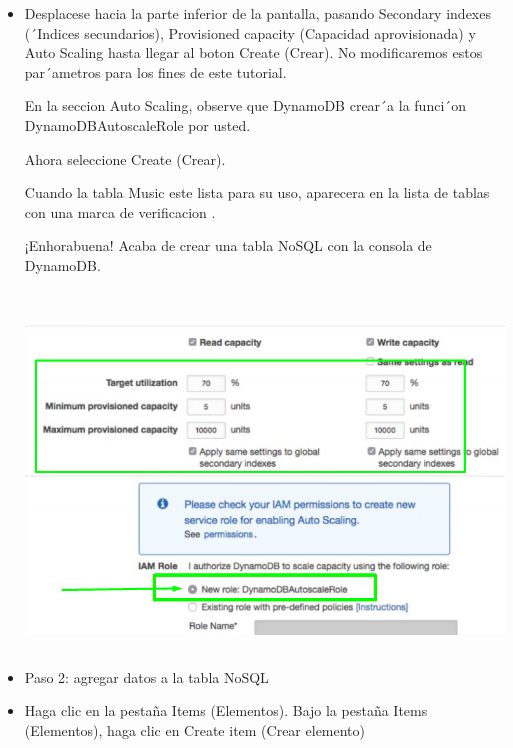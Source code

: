\documentclass[12pt,a4paper,oneside]{book}
\begin{document}
\begin{itemize}
\end{itemize}



	\newpage
\begin{itemize}
	\item {Desplacese hacia la parte inferior de la pantalla, pasando Secondary indexes (´Indices secundarios), Provisioned capacity (Capacidad aprovisionada) y Auto Scaling hasta llegar al boton Create (Crear). No modificaremos estos par´ametros para los fines de este tutorial.
		
		En la seccion Auto Scaling, observe que DynamoDB crear´a la funci´on DynamoDBAutoscaleRole por usted.
		
		Ahora seleccione Create (Crear).
		
		Cuando la tabla Music este lista para su uso, aparecera en la lista de tablas con una marca de verificacion .
		
		¡Enhorabuena! Acaba de crear una tabla NoSQL con la consola de DynamoDB.}\\
	
	\includegraphics[width=16cm, height=9cm]{img/8.png}\\
	
	
	
	\item {Paso 2: agregar datos a la tabla NoSQL}\\
	
	\item {Haga clic en la pestaña Items (Elementos). Bajo la pestaña Items (Elementos), haga clic en Create item (Crear elemento)}\\
	

\end{itemize}
\end{document}
